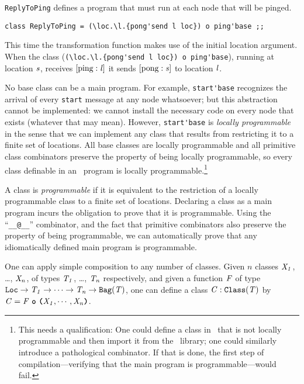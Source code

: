 \documentclass[final]{article}
\newcommand{\listinline}[1]{\text{\lstinline{#1}}}
\newcommand{\msg}[2]{\ensuremath{[\listinline{#1}:\NUPRL{#2}]}}
\begin{document}

\lstinline{ReplyToPing} defines a program that must run at each node
that will be pinged.
\begin{emlcode}
\begin{lstlisting}
class ReplyToPing = (\loc.\l.{pong'send l loc}) o ping'base ;;
\end{lstlisting}
\end{emlcode}
This time the transformation function makes use of the initial
location argument.  When the class
%
(\lstinline!(\loc.\l.{pong'send l loc}) o ping'base!),
%
running at location $\mathit{s}$, receives \msg{ping}{l} it sends
\msg{pong}{s} to location $\mathit{l}$.


No base class can be a main program. For example,
\lstinline{start'base} recognizes the arrival of every
\lstinline{start} message at any node whatsoever; but this abstraction
cannot be implemented: we cannot install the necessary code on every
node that exists (whatever that may mean).  However,
\lstinline{start'base} is \emph{locally programmable} in the sense
that we can implement any class that results from restricting it to a
finite set of locations.  All base classes are locally programmable
and all primitive class combinators preserve the property of being
locally programmable, so every class definable in an \eml\ program is
locally programmable.\footnote{This needs a qualification: One could
  define a class in \nuprl\ that is not locally programmable and then
  import it from the \nuprl\ library; one could similarly introduce a
  pathological combinator.  If that is done, the first step of
  compilation---verifying that the main program is
  programmable---would fail.}

A class is \emph{programmable} if it is equivalent to the restriction
of a locally programmable class to a finite set of locations.
Declaring a class as a main program incurs the obligation to prove
that it is programmable.  Using the ``\lstinline{__@__}'' combinator,
and the fact that primitive combinators also preserve the property of
being programmable, we can automatically prove that any idiomatically
defined main program is programmable.


One can apply simple composition
%
%
to any number of classes.  Given $n$ classes $\mathit{X_1}$, \dots,
$\mathit{X_n}$, of types $\mathit{T_1}$, \dots, $\mathit{T_n}$
respectively, and given a function $\mathit{F}$ of type
%
$\NUPRLarrow
{\NUPRLloc}
{\NUPRLarrow
  {\NUPRL{T_1}}
  {\NUPRLarrow
    {\cdots}
    {\NUPRLarrow
      {\NUPRL{T_n}}
      {\NUPRLbag{\NUPRL{T}}}
    }
  }
}$,
%
one can define a class $\mathit{C}:\mathtt{Class}(\mathit{T})$ by
$\mathit{C}=\mathit{F}\ \textbf{\texttt{o}}\ \textbf{\texttt{(}}\mathit{X_1},\cdots,\mathit{X_n}\textbf{\texttt{)}}$.
\end{document}
